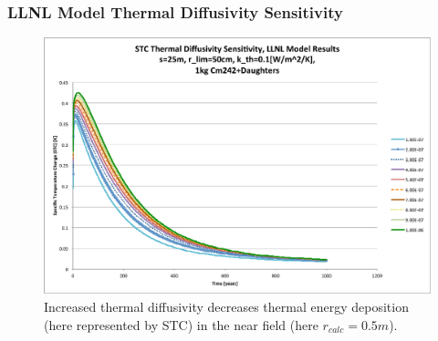 
\begin{frame}[ctb!]
\frametitle{LLNL Model Thermal Diffusivity Sensitivity}
\footnotesize{
\begin{figure}[htbp!]
\begin{center}
\includegraphics[height=0.7\textheight]{./thermal_demonstration/diffusivity/Cm242alpha_kth_low.eps}
\end{center}
\caption[$K_{th}$ Sensitivity to $\alpha_{th}$ for $k_{th}$]{Increased thermal diffusivity decreases thermal energy deposition 
(here represented by STC) in the near field (here $r_{calc} = 0.5m$).}
\label{fig:Cm242alpha_kth_low}
\end{figure}
}
\end{frame}


